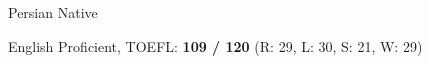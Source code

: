 

\begin{cvskills}

  \cvskill
    {Persian} %
    {Native} %

  \cvskill
    {English} %
    {Proficient, TOEFL: \textbf{109 / 120} (R: 29, L: 30, S: 21, W: 29)} %

\end{cvskills}
